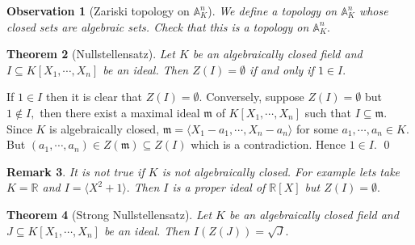 \documentclass[11pt]{amsart}
\newtheorem{theorem}{Theorem}[section]
\newtheorem{obs}[theorem]{Observation}
\newtheorem{remark}[theorem]{Remark}%
\newcommand{\RR}{\mathbb R}
\newcommand{\gen}[1]{\langle#1\rangle}
\begin{document}
\begin{obs}[Zariski topology on $\mathbb{A}_K^n$]

We define a topology on $\mathbb{A}^n_K$ whose closed sets are algebraic sets. Check that this is a topology on $\mathbb{A}_K^n.$

\end{obs}

\begin{theorem}[Nullstellensatz]

Let $K$ be an algebraically closed field and $I\subseteq K[X_1,\cdots,X_n]$ be an ideal. Then $Z(I)=\emptyset$ if and only if $1\in I.$

\end{theorem}

\proof If $1\in I$ then it is clear that $Z(I)=\emptyset.$ Conversely, suppose $Z(I)=\emptyset$ but $1\notin I,$ then there exist a maximal ideal $\mathfrak{m}$ of $K[X_1,\cdots,X_n]$ such that $I\subseteq \mathfrak{m}.$ Since $K$ is algebraically closed, $\mathfrak{m}=\gen{X_1-a_1,\cdots,X_n-a_n}$ for some $a_1,\cdots,a_n\in K.$ But $(a_1,\cdots,a_n)\in Z(\mathfrak{m})\subseteq Z(I)$ which is a contradiction. Hence $1\in I.$ \qed 

\begin{remark}

It is not true if $K$ is not algebraically closed. For example lets take $K={\RR}$ and $I=\gen{X^2+1}.$ Then $I$ is a proper ideal of ${\RR}[X]$ but $Z(I)=\emptyset.$

\end{remark}

\begin{theorem}[Strong Nullstellensatz]

Let $K$ be an algebraically closed field and $J\subseteq K[X_1,\cdots,X_n]$ be an ideal. Then $I(Z(J))=\sqrt{J}.$

\end{theorem}
\end{document}
